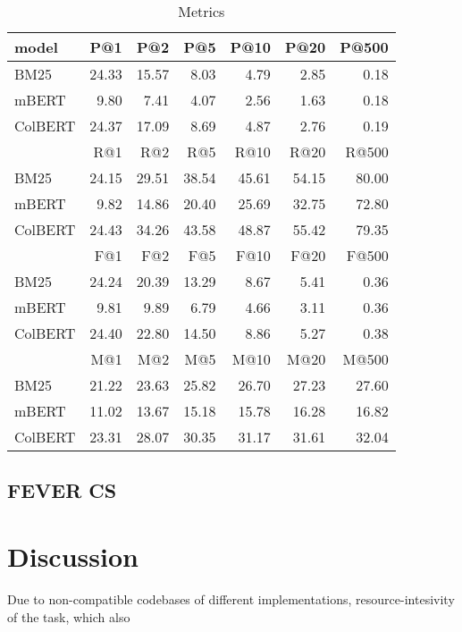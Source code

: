 \begin{table}[!htb]
    \centering
    \begin{tabular}{lrrrrrr}
        \toprule
           model &    P@1 &    P@2 &   P@5 &  P@10 &  P@20 &  P@500 \\
        \midrule
            BM25 &  24.33 &  15.57 &  8.03 &  4.79 &  2.85 &   0.18 \\
           mBERT &   9.80 &   7.41 &  4.07 &  2.56 &  1.63 &   0.18 \\
         ColBERT &  24.37 &  17.09 &  8.69 &  4.87 &  2.76 &   0.19 \\
        \midrule
              {} &    R@1 &    R@2 &    R@5 &   R@10 &   R@20 &  R@500 \\
        \midrule
            BM25 &  24.15 &  29.51 &  38.54 &  45.61 &  54.15 &  80.00 \\
           mBERT &   9.82 &  14.86 &  20.40 &  25.69 &  32.75 &  72.80 \\
         ColBERT &  24.43 &  34.26 &  43.58 &  48.87 &  55.42 &  79.35 \\
        \midrule
              {} &    F@1 &    F@2 &    F@5 &   F@10 &   F@20 &   F@500 \\
        \midrule
            BM25 &  24.24 &  20.39 &  13.29 &   8.67 &   5.41 &    0.36 \\
           mBERT &   9.81 &   9.89 &   6.79 &   4.66 &   3.11 &    0.36 \\
         ColBERT &  24.40 &  22.80 &  14.50 &   8.86 &   5.27 &    0.38 \\
        \midrule
              {} &  M@1 &  M@2 &  M@5 &  M@10 &  M@20 &  M@500 \\
        \midrule
            BM25 &  21.22 &  23.63 &  25.82 &   26.70 &   27.23 &    27.60 \\
           mBERT &  11.02 &  13.67 &  15.18 &   15.78 &   16.28 &    16.82 \\
         ColBERT &  23.31 &  28.07 &  30.35 &   31.17 &   31.61 &    32.04 \\
        \bottomrule
        \end{tabular}
    \caption[\CTK{} Metrics]{\CTK{} Metrics}
\end{table}

\subsection{\CTK}
\subsection{FEVER CS}

\section{Discussion}

Due to non-compatible codebases of different implementations, resource-intesivity of the task, which also 